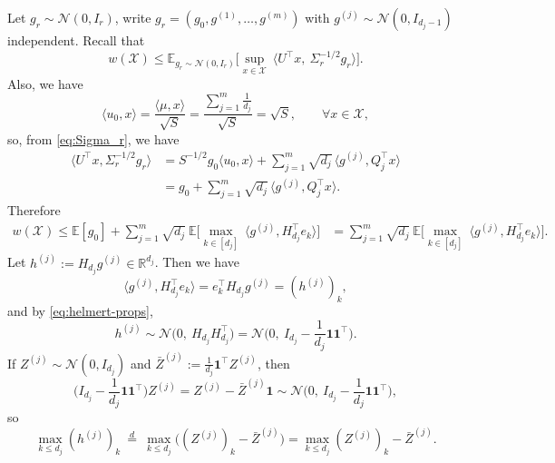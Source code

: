 Let \(g_r\sim\mathcal N(0,I_r)\), write \(g_r=(g_0,g^{(1)},\dots,g^{(m)})\) with
\(g^{(j)}\sim\mathcal N(0,I_{d_j-1})\) independent. Recall that
\begin{equation}\label{eq:width-intrinsic}
w(\mathcal X)\leq\mathbb E_{g_r\sim\mathcal{N}(0,I_r)}\Big[\sup_{x\in \mathcal X}\ \langle U^\top x,\ \Sigma_r^{-1/2}g_r\rangle\Big].\nonumber
\end{equation}
Also, we have
\begin{equation}\label{eq:u0-x}
\langle u_0,x\rangle=\frac{\langle \mu,x\rangle}{\sqrt S}
=\frac{\sum_{j=1}^m \frac1{d_j}}{\sqrt S}
=\sqrt S,\qquad \forall x\in \mathcal X,\nonumber
\end{equation}
so, from \eqref{eq:Sigma_r}, we have
\begin{align*}
\langle U^\top x,\Sigma_r^{-1/2}g_r\rangle
&=
S^{-1/2}g_0\langle u_0,x\rangle
+\sum_{j=1}^m \sqrt{d_j}\,\langle g^{(j)},Q_j^\top x\rangle\\
&=
g_0+\sum_{j=1}^m \sqrt{d_j}\,\langle g^{(j)},Q_j^\top x\rangle.
\end{align*}
Therefore
\begin{align}\label{eq:width-reduce}
w(\mathcal X)\leq
\mathbb E[g_0]
+\sum_{j=1}^m \sqrt{d_j}\ \mathbb E\Big[\max_{k\in[d_j]}\ \langle g^{(j)},H_{d_j}^\top e_k\rangle\Big]
&=
\sum_{j=1}^m \sqrt{d_j}\ \mathbb E\Big[\max_{k\in[d_j]}\ \langle g^{(j)},H_{d_j}^\top e_k\rangle\Big].
\end{align}
Let \(h^{(j)}:=H_{d_j}g^{(j)}\in\mathbb R^{d_j}\). Then we have
\begin{equation}\label{eq:h-coords}
\langle g^{(j)},H_{d_j}^\top e_k\rangle = e_k^\top H_{d_j}g^{(j)} = (h^{(j)})_k,\nonumber
\end{equation}
and by \eqref{eq:helmert-props},
\begin{equation}\label{eq:h-law}
h^{(j)}\sim\mathcal N\Big(0,\ H_{d_j}H_{d_j}^\top\Big)
=\mathcal N\Big(0,\ I_{d_j}-\frac1{d_j}\mathbf 1\mathbf 1^\top\Big).\nonumber
\end{equation}
If \(Z^{(j)}\sim\mathcal N(0,I_{d_j})\) and \(\bar Z^{(j)}:=\frac1{d_j}\mathbf 1^\top Z^{(j)}\), then
\begin{equation}\label{eq:center-proj}
\Big(I_{d_j}-\frac1{d_j}\mathbf 1\mathbf 1^\top\Big)Z^{(j)}
=Z^{(j)}-\bar Z^{(j)}\mathbf 1
\sim \mathcal N\Big(0,\ I_{d_j}-\frac1{d_j}\mathbf 1\mathbf 1^\top\Big),\nonumber
\end{equation}
so
\begin{equation}\label{eq:max-shift}
\max_{k\le d_j} (h^{(j)})_k\ \stackrel{d}{=}\ \max_{k\le d_j}\big((Z^{(j)})_k-\bar Z^{(j)}\big)
=\max_{k\le d_j} (Z^{(j)})_k-\bar Z^{(j)}.\nonumber
\end{equation}
